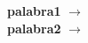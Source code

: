\begin{defcard}
    \textbf{palabra1} $\rightarrow$ \lipsum[1][1] \\
    \textbf{palabra2} $\rightarrow$ \lipsum[1][1]
\end{defcard}